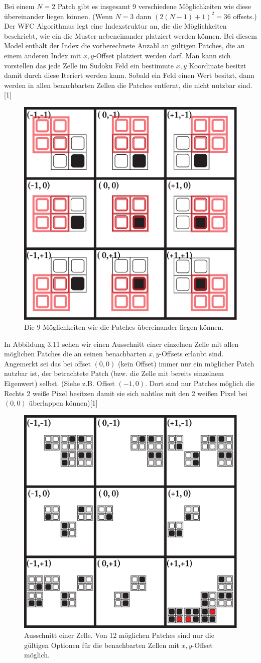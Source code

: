 \documentclass[12pt]{report}
\begin{document}
Bei einem $N = 2$ Patch gibt es insgesamt 9 verschiedene Möglichkeiten wie diese übereinander liegen können.
{(Wenn $N = 3$ dann $(2(N - 1) + 1)^2 = 36$ offsets.)}
Der WFC Algorithmus legt eine Indexstruktur an, die die Möglichkeiten beschriebt, wie ein die Muster nebeneinander platziert werden können.
Bei diesem Model enthält der Index die vorberechnete Anzahl an gültigen Patches, die an einem anderen Index mit $x,y$-Offset platziert werden darf. 
Man kann sich vorstellen das jede Zelle im Sudoku Feld ein bestimmte $x,y$ Koordinate besitzt damit durch diese Iteriert werden kann.
Sobald ein Feld einen Wert besitzt, dann werden in allen benachbarten Zellen die Patches entfernt, die nicht nutzbar sind. {[1]}

\begin{figure}[H]
    \centering
    \includegraphics[width=0.5\linewidth]{images/red-maze-offset.png}%
    \caption{Die 9 Möglichkeiten wie die Patches übereinander liegen können.}%
\end{figure}

In Abbildung 3.11 sehen wir einen Ausschnitt einer einzelnen Zelle mit allen möglichen Patches die an seinen benachbarten $x,y$-Offsets erlaubt sind.
Angemerkt sei das bei offset $(0,0)$ {(kein Offset)} immer nur ein möglicher Patch nutzbar ist, der betrachtete Patch {(bzw. die Zelle mit bereits einzelnem Eigenwert)} selbst.
{(Siehe z.B. Offset $(-1,0)$. Dort sind nur Patches möglich die Rechts 2 weiße Pixel besitzen damit sie sich nahtlos mit den 2 weißen Pixel bei $(0,0)$ überlappen können)}{[1]}

\begin{figure}[H]
    \centering
    \includegraphics[width=0.5\linewidth]{images/red-maze-offset-example.png}%
    \caption{Ausschnitt einer Zelle. Von 12 möglichen Patches sind nur die gültigen Optionen für die benachbarten Zellen mit $x,y$-Offset möglich.}%
\end{figure}
\end{document}
